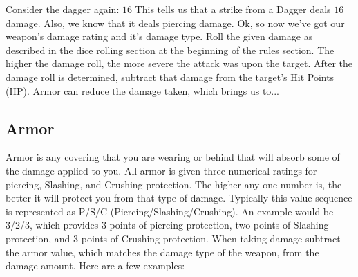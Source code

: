 \documentclass[twoside]{book}
\begin{document}
   Consider the dagger again: \ensuremath{1}\ensuremath{6}\ensuremath{}  This tells us that a strike from a Dagger deals \ensuremath{1}\ensuremath{6}\ensuremath{}damage. Also, we know that it deals piercing damage.
                Ok, so now we've got our weapon's damage
               rating and it's damage type. Roll the given damage
               as described in the dice rolling section at the beginning
               of the rules section. The higher the damage roll, the more
               severe the attack was upon the target.  After the damage roll is determined, subtract that
               damage from the target's Hit Points (HP). Armor can
               reduce the damage taken, which brings us to...
               
    

\subsection{Armor}
     Armor is any covering that you are wearing or behind
               that will absorb some of the damage applied to you. All
               armor is given three numerical ratings for piercing,
               Slashing, and Crushing protection. The higher any one
               number is, the better it will protect you from that type
               of damage. Typically this value sequence is represented as
               P/S/C (Piercing/Slashing/Crushing). An example would be
               3/2/3, which provides 3 points of piercing protection, two
               points of Slashing protection, and 3 points of Crushing
               protection.  When taking damage subtract the armor value, which
               matches the damage type of the weapon, from the damage
               amount.  Here are a few examples: 
  

  
\end{document}
